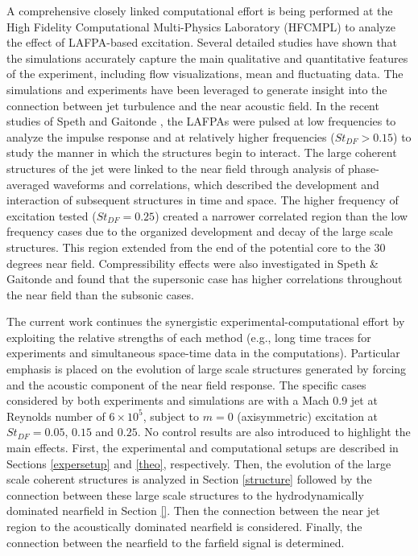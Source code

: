 \documentclass[english]{aiaa-tc}
\begin{document}
A comprehensive closely linked computational effort is being performed at the High Fidelity Computational Multi-Physics Laboratory (HFCMPL) to analyze the effect of LAFPA-based excitation.
Several detailed studies have shown that the simulations accurately capture the main qualitative and quantitative features of the experiment, including flow visualizations, mean and fluctuating data.
The simulations and experiments have been leveraged to generate insight into the connection between jet turbulence and the near acoustic field.
In the recent studies of Speth and Gaitonde \cite{spethASME2013,speth2014}, the LAFPAs were pulsed at low frequencies to analyze the impulse response and at relatively higher frequencies ($St_{DF}>0.15$) to study the manner in which the structures begin to interact.
The large coherent structures of the jet were linked to the near field through analysis of phase-averaged waveforms and correlations, which described the development and interaction of subsequent structures in time and space.
The higher frequency of excitation tested ($St_{DF}=0.25$) created a narrower correlated region than the low frequency cases due to the organized development and decay of the large scale structures.
This region extended from the end of the potential core to the 30 degrees near field. Compressibility effects were also investigated in Speth \& Gaitonde \cite{speth2014} and found that the supersonic case has higher correlations throughout the near field than the subsonic cases.

The current work continues the synergistic experimental-computational effort by exploiting the relative strengths of each method (e.g., long time traces for experiments and simultaneous space-time data in the computations).
Particular emphasis is placed on the evolution of large scale structures generated by forcing and the acoustic component of the near field response.
The specific cases considered by both experiments and simulations are with a Mach 0.9 jet at Reynolds number of $6 \times 10^{5}$, subject to $m=0$ (axisymmetric) excitation at $St_{DF}= 0.05$, $0.15$ and $0.25$.
No control results are also introduced to highlight the main effects. First, the experimental and computational setups are described in Sections \ref{expersetup} and \ref{theo}, respectively.
Then, the evolution of the large scale coherent structures is analyzed in Section \ref{structure} followed by the connection between these large scale structures to the hydrodynamically dominated nearfield in Section \ref{}.
Then the connection between the near jet region to the acoustically dominated nearfield is considered.
Finally, the connection between the nearfield to the farfield signal is determined.
\end{document}
